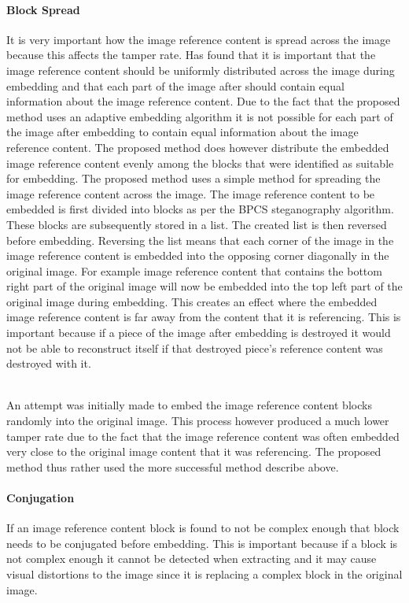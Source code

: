 \documentclass[12pt]{article}
\begin{document}
\paragraph{Block Spread}
It is very important how the image reference content is spread across the image because this affects the tamper rate.
\cite{korus2013efficient} Has found that it is important that the image reference content should be uniformly distributed across the image during embedding and that each part of the image after should contain equal information about the image reference content.
Due to the fact that the proposed method uses an adaptive embedding algorithm it is not possible for each part of the image after embedding to contain equal information about the image reference content.
The proposed method does however distribute the embedded image reference content evenly among the blocks that were identified as suitable for embedding.
The proposed method uses a simple method for spreading the image reference content across the image.
The image reference content to be embedded is first divided into blocks as per the BPCS steganography algorithm.
These blocks are subsequently stored in a list. 
The created list is then reversed before embedding.
Reversing the list means that each corner of the image in the image reference content is embedded into the opposing corner diagonally in the original image. For example image reference content that contains the bottom right part of the original image will now be embedded into the top left part of the original image during embedding. 
This creates an effect where the embedded image reference content is far away from the content that it is referencing.
This is important because if a piece of the image after embedding is destroyed it would not be able to reconstruct itself if that destroyed piece's reference content was destroyed with it.

\hspace{0pt} \\
An attempt was initially made to embed the image reference content blocks randomly into the original image.
This process however produced a much lower tamper rate due to the fact that the image reference content was often embedded very close to the original image content that it was referencing.
The proposed method thus rather used the more successful method describe above.

\paragraph{Conjugation}
If an image reference content block is found to not be complex enough that block needs to be conjugated before embedding.
This is important because if a block is not complex enough it cannot be detected when extracting and it may cause visual distortions to the image since it is replacing a complex block in the original image.
\end{document}
